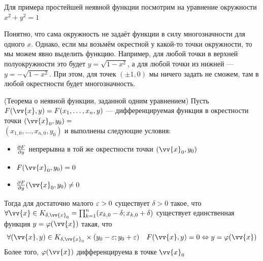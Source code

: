 \begin{example}
	Для примера простейшей неявной функции посмотрим на уравнение окружности $x^2 + y^2 = 1$
	
	Понятно, что сама окружность не задаёт функции в силу многозначности для одного $x$. Однако, если мы возьмём окрестной у какой-то точки окружности, то мы можем явно выделить функцию. Например, для любой точки в верхней полуокружности это будет $y = \sqrt{1 - x^2}$, а для любой точки из нижней --- $y = -\sqrt{1 - x^2}$. При этом, для точек $(\pm 1, 0)$ мы ничего задать не сможем, там в любой окрестности будет многозначность.
\end{example}

\begin{theorem} (Теорема о неявной функции, заданной одним уравнением)
	Пусть $F(\vv{x}, y) = F(x_1, \ldots, x_n, y)$ --- дифференцируемая функция в окрестности точки $(\vv{x}_0, y_0) =$ \\ $(x_{1, 0}, \ldots, x_{n, 0}, y_0)$ и выполнены следующие условия:
	\begin{itemize}
		\item $\frac{\partial F}{\partial y}$ непрерывна в той же окрестности точки $(\vv{x}_0, y_0)$
		
		\item $F(\vv{x}_0, y_0) = 0$
		
		\item $\pd{F}{y}(\vv{x}_0, y_0) \neq 0$
	\end{itemize}
	Тогда для достаточно малого $\varepsilon > 0$ существует $\delta > 0$ такое, что $\forall \vv{x} \in K_{\delta, \vv{x}_0} = \prod_{k = 1}^n (x_{k, 0} - \delta; x_{k, 0} + \delta)$ существует единственная функция $y = \phi(\vv{x})$ такая, что
	\[
		\forall (\vv{x}, y) \in K_{\delta, \vv{x}_0} \times (y_0 - \eps; y_0 + \eps) \quad F(\vv{x}, y) = 0 \lra y = \phi(\vv{x})
	\]
	Более того, $\phi(\vv{x})$ дифференцируема в точке $\vv{x}_0$
\end{theorem}

